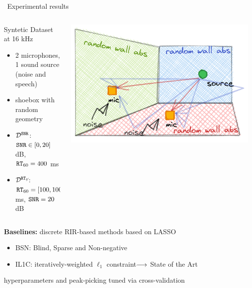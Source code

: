 \begin{frame}{\faFlask~Experimental results \hfill\faJediOrder}

    \begin{columns}[onlytextwidth]
        \begin{column}{0.60\textwidth}
            \begin{block}{Syntetic Dataset at 16 kHz}
                \small
                \begin{itemize}
                    \item 2 microphones, 1 sound source (noise and speech)
                    \item shoebox with random geometry
                    \item $\mathcal{D^{\mathtt{SNR}}}$: $\mathtt{SNR} \in [0, 20]$ dB, $\mathtt{RT}_{60} = 400$ ms
                    \item $\mathcal{D^{\mathtt{RT}_{60}}}$: $\mathtt{RT}_{60} = [100, 1000]$ ms, $\mathtt{SNR} = 20$ dB
                \end{itemize}
            \end{block}
        \end{column}

        \begin{column}{0.40\textwidth}
        \includegraphics[width=\textwidth]{figures/aer_scenario.png}
        \end{column}
    \end{columns}

    \pause
    \vfill
    \begin{mysotablock}

        \textbf{Baselines:} discrete RIR-based methods based on LASSO
        \begin{itemize}
            \item BSN: Blind, Sparse and Non-negative\footnotemark[1]
            \item IL1C: iteratively-weighted $\ell_1$ constraint\footnotemark[2] $\longrightarrow$ State of the Art
        \end{itemize}
        {\footnotesize \hfill hyperparameters and peak-picking tuned via cross-validation}
    \end{mysotablock}


\end{frame}
